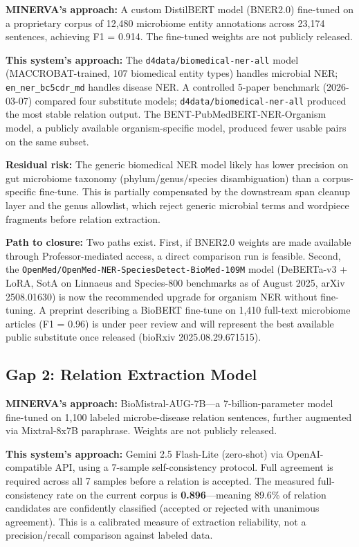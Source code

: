 \documentclass[12pt, letterpaper]{article}
\begin{document}
\textbf{MINERVA's approach:} A custom DistilBERT model (BNER2.0) fine-tuned on a proprietary corpus of 12,480 microbiome entity annotations across 23,174 sentences, achieving F1 = 0.914. The fine-tuned weights are not publicly released.

\textbf{This system's approach:} The \texttt{d4data/biomedical-ner-all} model (MACCROBAT-trained, 107 biomedical entity types) handles microbial NER; \texttt{en\_ner\_bc5cdr\_md} handles disease NER. A controlled 5-paper benchmark (2026-03-07) compared four substitute models; \texttt{d4data/biomedical-ner-all} produced the most stable relation output. The BENT-PubMedBERT-NER-Organism model, a publicly available organism-specific model, produced fewer usable pairs on the same subset.

\textbf{Residual risk:} The generic biomedical NER model likely has lower precision on gut microbiome taxonomy (phylum/genus/species disambiguation) than a corpus-specific fine-tune. This is partially compensated by the downstream span cleanup layer and the genus allowlist, which reject generic microbial terms and wordpiece fragments before relation extraction.

\textbf{Path to closure:} Two paths exist. First, if BNER2.0 weights are made available through Professor-mediated access, a direct comparison run is feasible. Second, the \texttt{OpenMed/OpenMed-NER-SpeciesDetect-BioMed-109M} model (DeBERTa-v3 + LoRA, SotA on Linnaeus and Species-800 benchmarks as of August 2025, arXiv 2508.01630) is now the recommended upgrade for organism NER without fine-tuning. A preprint describing a BioBERT fine-tune on 1,410 full-text microbiome articles (F1 = 0.96) is under peer review and will represent the best available public substitute once released (bioRxiv 2025.08.29.671515).

\subsection{Gap 2: Relation Extraction Model}

\textbf{MINERVA's approach:} BioMistral-AUG-7B—a 7-billion-parameter model fine-tuned on 1,100 labeled microbe-disease relation sentences, further augmented via Mixtral-8x7B paraphrase. Weights are not publicly released.

\textbf{This system's approach:} Gemini 2.5 Flash-Lite (zero-shot) via OpenAI-compatible API, using a 7-sample self-consistency protocol. Full agreement is required across all 7 samples before a relation is accepted. The measured full-consistency rate on the current corpus is \textbf{0.896}—meaning 89.6\% of relation candidates are confidently classified (accepted or rejected with unanimous agreement). This is a calibrated measure of extraction reliability, not a precision/recall comparison against labeled data.
\end{document}
